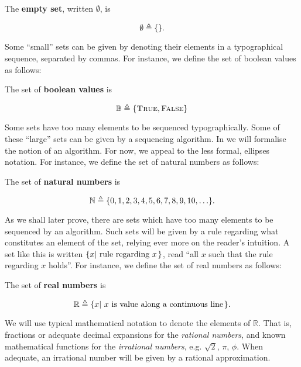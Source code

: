 
\begin{definition} The \textbf{empty set}, written $\emptyset$, is

$$\emptyset\triangleq\mathopen{}\left\{{}\right\}\mathclose{}.$$

\end{definition}

Some ``small'' sets can be given by denoting their elements in a typographical
sequence, separated by commas. For instance, we define the set of boolean
values as follows:

\begin{definition} The set of \textbf{boolean values} is

$$\mathbb{B}\triangleq\mathopen{}\left\{{\text{\textsc{True}},\text{\textsc{False}}}\right\}\mathclose{}$$

\end{definition}

Some sets have too many elements to be sequenced typographically. Some of these
``large'' sets can be given by a sequencing algorithm. In
 we will formalise the notion of an
algorithm. For now, we appeal to the less formal, ellipses notation. For
instance, we define the set of natural numbers as follows:

\begin{definition} The set of \textbf{natural numbers} is

$$\mathbb{N} \triangleq \mathopen{}\left\{{0,1,2,3,4,5,6,7,8,9,10,\ldots}\right\}\mathclose{}.$$

\end{definition}

As we shall later prove, there are sets which have too many elements to be
sequenced by an algorithm.  Such sets will be given by a rule regarding what
constitutes an element of the set, relying ever more on the reader's intuition.
A set like this is written $\mathopen{}\left\{{x\mathopen{}\left|\ {\text{rule regarding $x$}}\right.\mathclose{}}\right\}\mathclose{}$, read ``all
$x$ such that the rule regarding $x$ holds''. For instance, we define the set
of real numbers as follows:

\begin{definition} The set of \textbf{real numbers} is

$$\mathbb{R}\triangleq\mathopen{}\left\{{x\mathopen{}\left|\ {\text{$x$ is value along a continuous
line}}\right.\mathclose{}}\right\}\mathclose{}.$$

\end{definition}

We will use typical mathematical notation to denote the elements of
$\mathbb{R}$. That is, fractions or adequate decimal expansions for the
\emph{rational numbers}, and known mathematical functions for the
\emph{irrational numbers}, e.g. $\sqrt{2}$, $\pi$, $\phi$. When adequate,
an irrational number will be given by a rational approximation.

